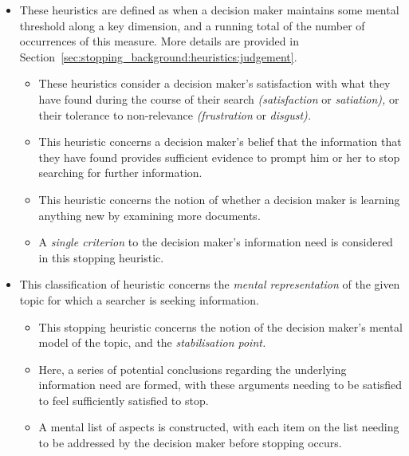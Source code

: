 \begin{itemize}
    \item{ These heuristics are defined as when a decision maker maintains some mental threshold along a key dimension, and a running total of the number of occurrences of this measure. More details are provided in Section~\ref{sec:stopping_background:heuristics:judgement}.}
    \begin{itemize}
        \item{ These heuristics consider a decision maker's satisfaction with what they have found during the course of their search \emph{(satisfaction} or \emph{satiation),} or their tolerance to non-relevance \emph{(frustration} or \emph{disgust).}}
        \item{ This heuristic concerns a decision maker's belief that the information that they have found provides sufficient evidence to prompt him or her to stop searching for further information.}
        \item{ This heuristic concerns the notion of whether a decision maker is learning anything new by examining more documents.}
        \item{ A \emph{single criterion} to the decision maker's information need is considered in this stopping heuristic.}
    \end{itemize}
    
    \item{ This classification of heuristic concerns the \emph{mental representation} of the given topic for which a searcher is seeking information.}
    \begin{itemize}
        \item{ This stopping heuristic concerns the notion of the decision maker's mental model of the topic, and the \emph{stabilisation point.}}
        \item{ Here, a series of potential conclusions regarding the underlying information need are formed, with these arguments needing to be satisfied to feel sufficiently satisfied to stop.}
        \item{ A mental list of aspects is constructed, with each item on the list needing to be addressed by the decision maker before stopping occurs.}
    \end{itemize}
\end{itemize}

